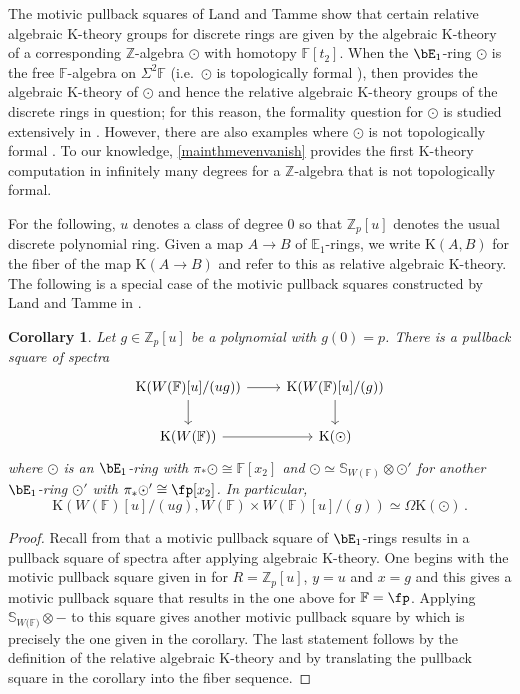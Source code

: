 \documentclass[english,10pt]{amsart}
\newcommand{\sph}{\mathbb{S}}
\newcommand{\sphwf}{\mathbb{S}_{W(\mathbb{F)}}}
\newcommand{\field}{\mathbb{F}}
\newtheorem{coro}{Corollary}[section]
\theoremstyle{definition}
\numberwithin{equation}{section}
\newcommand{\z}{\mathbb{Z}}
\newcommand{\zp}{\mathbb{Z}_p}
\newcommand{\pis}{\pi_*}
\begin{document}
The motivic pullback squares of Land and Tamme \cite{land2023kthrypushouts} show that certain relative algebraic K-theory groups for discrete rings are given by the algebraic K-theory of a corresponding $\z$-algebra $\odot$ with homotopy $\field[t_2]$. When the $\bE_1$-ring $\odot$ is the free $\field$-algebra on $\Sigma^2 \field$ (i.e.\ $\odot$ is topologically formal \cite{bayindir2025towards}), then \cite{bayindir2020kthryofthh} provides the algebraic K-theory of $\odot$ and hence the relative algebraic K-theory groups of the discrete rings in question; for this reason, the formality question for $\odot$ is studied extensively in \cite{bayindir2025towards}. However, there are also examples where $\odot$ is not topologically formal \cite[Example~4.31]{land2023kthrypushouts}.  To our knowledge, \autoref{mainthmevenvanish} provides the first  K-theory computation in infinitely many degrees for a $\z$-algebra that is not topologically formal.

For the following, $u$ denotes a class of degree $0$ so that $\zp[u]$ denotes the usual  discrete polynomial ring.  Given a map $A\to B$ of $\mathbb{E}_1$-rings, we write $\mathrm{K}(A,B)$ for the fiber of the map $\mathrm{K}(A\to B)$ and refer to this as relative algebraic K-theory. The following is a special case of the motivic pullback squares constructed by Land and Tamme in \cite{land2023kthrypushouts}.

\begin{coro}\label{coro general motivic pullback square}
Let $g \in \zp[u]$ be a polynomial with $g(0) = p$.
There is a pullback square of spectra
\begin{equation*}
\begin{tikzcd}
\mathrm{K}(W(\field)[u]/(ug)) \ar[d] \ar[r] & \mathrm{K}(W(\field)[u]/(g)) \ar[d]\\
\mathrm{K}(W(\field)) \ar[r] & \mathrm{K}(\odot)
\end{tikzcd}
\end{equation*}
where $\odot$ is an $\bE_1$-ring with $\pis \odot \cong \field[x_2]$ and $\odot \simeq \sph_{W(\field)}\otimes \odot'$ for another $\bE_1$-ring $\odot'$ with $\pis \odot' \cong \fp[x_2]$. In particular,
\[\mathrm{K}(W(\field)[u]/(ug),W(\field) \times W(\field)[u]/(g)) \simeq \Omega \mathrm{K}(\odot) \,.\]
\end{coro}
\begin{proof}
Recall from \cite{land2023kthrypushouts} that a motivic pullback square of $\bE_1$-rings results in a pullback square of spectra after applying algebraic K-theory. 
One begins with the motivic pullback square given in \cite[Lemma~4.30]{land2023kthrypushouts} for $R = \zp[u]$, $y = u$ and $x = g$ and this gives a motivic pullback square that results in the one above for $\field = \fp$. Applying $\sphwf \otimes -$ to this square gives another motivic pullback square by \cite[Proposition 2.16]{land2023kthrypushouts} which is precisely the one given in the corollary. The last statement follows by the definition of the relative algebraic K-theory and by translating the pullback square in the corollary into the fiber sequence.
\end{proof}
\end{document}
